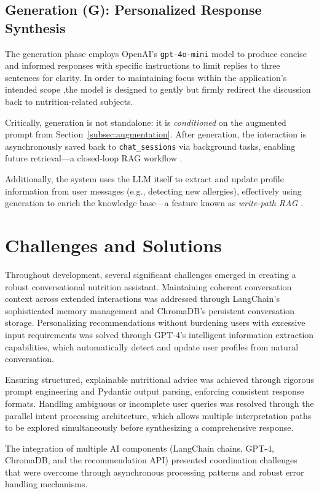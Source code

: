 \subsection{Generation (G): Personalized Response Synthesis}
\label{subsec:generation}

The generation phase employs OpenAI’s \texttt{gpt-4o-mini} model to produce concise and informed responses with specific instructions to limit replies to three sentences for clarity. In order to maintaining focus within the application’s intended scope ,the model is designed to gently but firmly redirect the discussion back to nutrition-related subjects.


Critically, generation is not standalone: it is \textit{conditioned} on the augmented prompt from Section~\ref{subsec:augmentation}. After generation, the interaction is asynchronously saved back to \texttt{chat\_sessions} via background tasks, enabling future retrieval—a closed-loop RAG workflow \cite{lewis2020retrieval}.

Additionally, the system uses the LLM itself to extract and update profile information from user messages (e.g., detecting new allergies), effectively using generation to enrich the knowledge base—a feature known as \textit{write-path RAG} \cite{gao2023survey}.

\section{Challenges and Solutions}
Throughout development, several significant challenges emerged in creating a robust conversational nutrition assistant. Maintaining coherent conversation context across extended interactions was addressed through LangChain's sophisticated memory management and ChromaDB's persistent conversation storage. Personalizing recommendations without burdening users with excessive input requirements was solved through GPT-4's intelligent information extraction capabilities, which automatically detect and update user profiles from natural conversation.

Ensuring structured, explainable nutritional advice was achieved through rigorous prompt engineering and Pydantic output parsing, enforcing consistent response formats. Handling ambiguous or incomplete user queries was resolved through the parallel intent processing architecture, which allows multiple interpretation paths to be explored simultaneously before synthesizing a comprehensive response.

The integration of multiple AI components (LangChain chains, GPT-4, ChromaDB, and the recommendation API) presented coordination challenges that were overcome through asynchronous processing patterns and robust error handling mechanisms.

